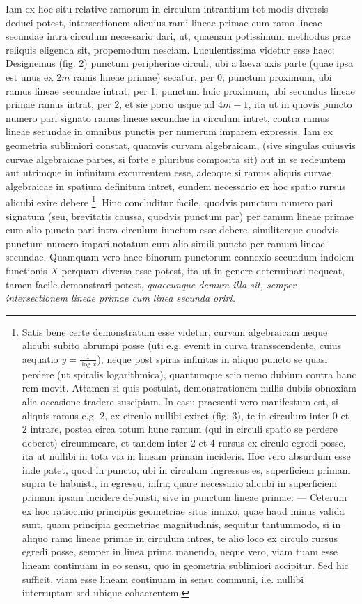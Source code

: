 \documentclass[14pt]{memoir}
\theoremstyle{plain}
\theoremstyle{remark}
\begin{document}
Iam ex hoc situ relative ramorum in circulum intrantium tot modis diversis deduci potest, intersectionem alicuius rami lineae primae cum ramo lineae secundae intra circulum necessario dari, ut, quaenam potissimum methodus prae reliquis eligenda sit, propemodum nesciam. Luculentissima videtur esse haec: Designemus (fig. 2) punctum peripheriae circuli, ubi a laeva axis parte (quae ipsa est unus ex \(2m\) ramis lineae primae) secatur, per \(0\); punctum proximum, ubi ramus lineae secundae intrat, per \(1\); punctum huic proximum, ubi secundus lineae primae ramus intrat, per \(2\), et sie porro usque ad \(4m-1\), ita ut in quovis puncto numero pari signato ramus lineae secundae in circulum intret, contra ramus lineae secundae in omnibus punctis per numerum imparem expressis. Iam ex geometria sublimiori constat, quamvis curvam algebraicam, (sive singulas cuiusvis curvae algebraicae partes, si forte e pluribus composita sit) aut in se redeuntem aut utrimque in infinitum excurrentem esse, adeoque si ramus aliquis curvae algebraicae in spatium definitum intret, eundem necessario ex hoc spatio rursus alicubi exire debere \footnote{ Satis bene certe demonstratum esse videtur, curvam algebraicam neque alicubi subito abrumpi posse (uti e.g. evenit in curva transscendente, cuius aequatio \( y = \frac{1}{\log x} \)), neque post spiras infinitas in aliquo puncto se quasi perdere (ut spiralis logarithmica), quantumque scio nemo dubium contra hanc rem movit. Attamen si quis postulat, demonstrationem nullis dubiis obnoxiam alia occasione tradere suscipiam. In casu praesenti vero manifestum est, si aliquis ramus e.g. 2, ex circulo nullibi exiret (fig. 3), te in circulum inter \(0\) et \(2\) intrare, postea circa totum hunc ramum (qui in circuli spatio se perdere deberet) circummeare, et tandem inter \(2\) et \(4\) rursus ex circulo egredi posse, ita ut nullibi in tota via in lineam primam incideris.   Hoc vero absurdum esse inde patet,  quod in puncto, ubi in circulum ingressus es, superficiem primam supra te habuisti, in egressu, infra; quare necessario alicubi in superficiem primam ipsam incidere debuisti, sive in punctum lineae primae. — Ceterum ex hoc ratiocinio principiis geometriae situs innixo, quae haud minus valida sunt, quam principia geometriae magnitudinis, sequitur tantummodo, si in aliquo ramo lineae primae in circulum intres, te alio loco ex circulo rursus egredi posse, semper in linea prima manendo, neque vero, viam tuam esse lineam continuam in eo sensu, quo in geometria sublimiori accipitur. Sed hic sufficit, viam esse lineam continuam in sensu communi, i.e. nullibi interruptam sed ubique cohaerentem.}. Hinc concluditur facile, quodvis punctum numero pari signatum (seu, brevitatis caussa, quodvis punctum par) per ramum lineae primae cum alio puncto pari intra circulum iunctum esse debere, similiterque quodvis punctum numero impari notatum cum alio simili puncto per ramum lineae secundae.  Quamquam vero haec binorum punctorum connexio secundum indolem functionis \(X\) perquam diversa esse potest, ita ut in genere determinari nequeat, tamen facile demonstrari potest, \textit{quaecunque demum illa sit, semper intersectionem lineae primae cum linea secunda oriri.}
\end{document}

